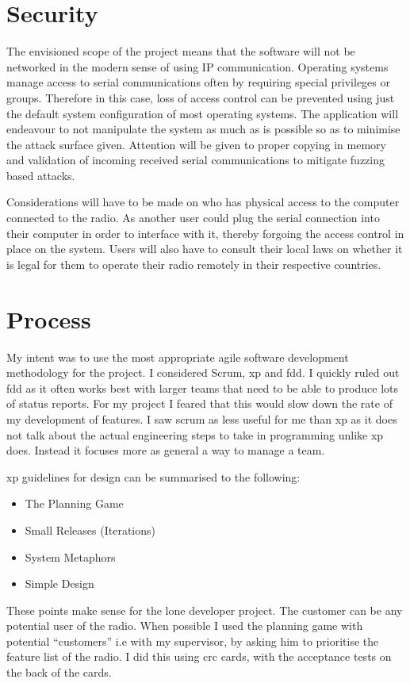 \section{Security}
The envisioned scope of the project means that the software will not be networked in the modern sense of using IP communication. Operating systems manage access to serial communications often by requiring special privileges or groups. Therefore in this case, loss of access control can be prevented using just the default system configuration of most operating systems. The application will endeavour to not manipulate the system as much as is possible so as to minimise the attack surface given. Attention will be given to proper copying in memory and validation of incoming received serial communications to mitigate fuzzing based attacks.

Considerations will have to be made on who has physical access to the computer connected to the radio. As another user could plug the serial connection into their computer in order to interface with it, thereby forgoing the access control in place on the system. Users will also have to consult their local laws on whether it is legal for them to operate their radio remotely in their respective countries. 

\section{Process}
My intent was to use the most appropriate agile software development methodology for the project. I considered Scrum, \gls{xp} and \gls{fdd}. I quickly ruled out \gls{fdd} as it often works best with larger teams that need to be able to produce lots of status reports. For my project I feared that this would slow down the rate of my development of features. I saw scrum as less useful for me than \gls{xp} as it does not talk about the actual engineering steps to take in programming unlike \gls{xp} does. Instead it focuses more as general a way to manage a team. 

\gls{xp} guidelines for design can be summarised to the following\cite{xp}:
\begin{itemize}
    \item The Planning Game 	
    \item Small Releases (Iterations)
    \item System Metaphors
    \item Simple Design 	
\end{itemize}
These points make sense for the lone developer project. The customer can be any potential user of the radio. When possible I used the planning game with potential ``customers'' i.e with my supervisor, by asking him to prioritise the feature list of the radio. I did this using \gls{crc} cards, with the acceptance tests on the back of the cards. 


